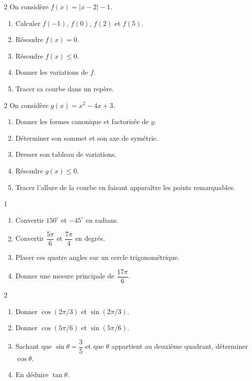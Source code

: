 \begin{exo}{2}
On considère $f(x)=|x-2|-1$.
\begin{enumerate}
  \item Calculer $f(-1)$, $f(0)$, $f(2)$ et $f(5)$.
  \item Résoudre $f(x)=0$.
  \item Résoudre $f(x)\leq0$.
  \item Donner les variations de $f$.
  \item Tracer sa courbe dans un repère.
\end{enumerate}
\end{exo}

\begin{exo}{2}
On considère $g(x)=x^2-4x+3$.
\begin{enumerate}
  \item Donner les formes canonique et factorisée de $g$.
  \item Déterminer son sommet et son axe de symétrie.
  \item Dresser son tableau de variations.
  \item Résoudre $g(x)\leq0$.
  \item Tracer l'allure de la courbe en faisant apparaître les points remarquables.
\end{enumerate}
\end{exo}

\begin{exo}{1}
\begin{enumerate}
  \item Convertir $150^\circ$ et $-45^\circ$ en radians.
  \item Convertir $\dfrac{5\pi}{6}$ et $\dfrac{7\pi}{4}$ en degrés.
  \item Placer ces quatre angles sur un cercle trigonométrique.
  \item Donner une mesure principale de $\dfrac{17\pi}{6}$.
\end{enumerate}
\end{exo}

\begin{exo}{2}
\begin{enumerate}
  \item Donner $\cos(2\pi/3)$ et $\sin(2\pi/3)$.
  \item Donner $\cos(5\pi/6)$ et $\sin(5\pi/6)$.
  \item Sachant que $\sin\theta=\dfrac35$ et que $\theta$ appartient au
  deuxième quadrant, déterminer $\cos\theta$.
  \item En déduire $\tan\theta$.
\end{enumerate}
\end{exo}

